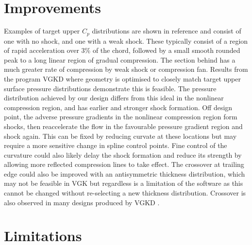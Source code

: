 \documentclass{article}
\begin{document}
\section{Improvements}
Examples of target upper $C_p$ distributions are shown in reference \cite{esdu} and consist of one with no shock, and one with a weak shock.
These typically consist of a region of rapid acceleration over 3\% of the chord, followed by a small smooth rounded peak to a long linear region of gradual compression.
The section behind has a much greater rate of compression by weak shock or compression fan.
Results from the program VGKD where geometry is optimised to closely match target upper surface pressure distributions demonstrate this is feasible.
The pressure distribution achieved by our design differs from this ideal in the nonlinear compression region, and has earlier and stronger shock formation.
Off design point, the adverse pressure gradients in the nonlinear compression region form shocks, then reaccelerate the flow in the favourable pressure gradient region and shock again.
This can be fixed by reducing curvate at these locations but may require a more sensitive change in spline control points.
Fine control of the curvature could also likely delay the shock formation and reduce its strength by allowing more reflected compression lines to take effect.
The crossover at trailing edge could also be improved with an antisymmetric thickness distribution, which may not be feasible in VGK
but regardless is a limitation of the software as this cannot be changed without re-selecting a new thickness distribution.
Crossover is also observed in many designs produced by VGKD \cite{esdu}.

\section{Limitations}
\end{document}
